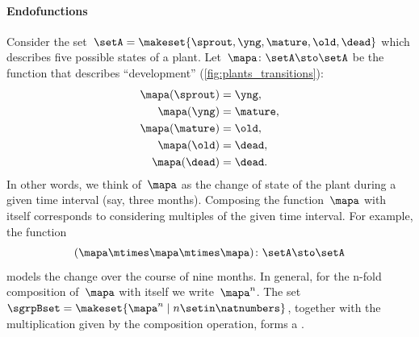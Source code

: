 \begin{marginfigure}
    \centering
    \caption{Graphical representation of plant transitions.}
    \label{fig:plants_transitions}
\end{marginfigure}


\paragraph{Endofunctions}


\begin{example}
    \label{exa:plant-trafo-semigroup}
    Consider the set~$\setA = \makeset{ \sprout, \yng, \mature, \old, \dead }$ which describes five possible states of a plant.
    Let~$\mapa \colon \setA \sto \setA$ be the function that describes ``development'' (\cref{fig:plants_transitions}):
    \begin{align}
        \mapa(\sprout) & = \yng, \\
        \mapa(\yng)    & = \mature, \\
        \mapa(\mature) & = \old, \\
        \mapa( \old)   & = \dead, \\
        \mapa (\dead)  & = \dead.
    \end{align}
    In other words, we think of~$\mapa$ as the change of state of the plant during a given time interval (say, three months).
    Composing the function~$\mapa$ with itself corresponds to considering multiples of the given time interval.
    For example, the function
    \begin{equation}
        (\mapa \mtimes \mapa \mtimes \mapa)
        \colon \setA \sto \setA
    \end{equation}
    models the change over the course of nine months.
    In general, for the n-fold composition of~$\mapa$ with itself we write~$\mapa^n$.
    The set~$\sgrpBset = \makeset{ \mapa^n \mid n \setin \natnumbers }$, together with the multiplication given by the composition operation, forms a .
\end{example}
%
